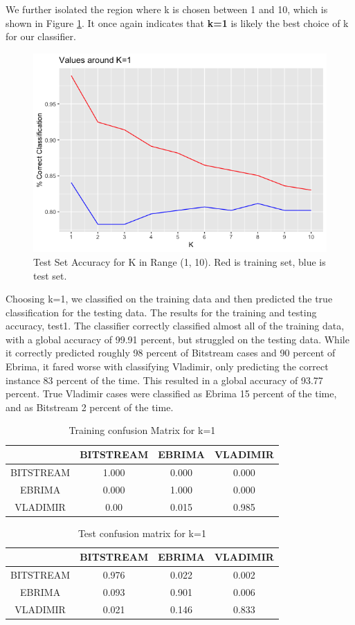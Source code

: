 \documentclass{homework}
\begin{document}
\question
We further isolated the region where k is chosen between 1 and 10, which is shown in Figure \ref{fig:Figure 2}. It once again indicates that \textbf{k=1} is likely the best choice of k for our classifier.

\begin{figure}[h]
    \centering
    \includegraphics[width=13cm]{graphs/Kbest.png}
    \caption{Test Set Accuracy for K in Range (1, 10). Red is training set, blue is test set.}
    \label{fig:Figure 2}
\end{figure}

\question
Choosing k=1, we classified on the training data and then predicted the true classification for the testing data. The results for the training and testing accuracy, test1. The classifier correctly classified almost all of the training data, with a global accuracy of 99.91 percent, but struggled on the testing data. While it correctly predicted roughly 98 percent of Bitstream cases and 90 percent of Ebrima, it fared worse with classifying Vladimir, only predicting the correct instance 83 percent of the time. This resulted in a global accuracy of 93.77 percent. True Vladimir cases were classified as Ebrima 15 percent of the time, and as Bitstream 2 percent of the time.

\begin{table}[h]
    \centering
        \begin{tabular}{c|ccc}
         &BITSTREAM&EBRIMA&VLADIMIR\\\hline
         BITSTREAM&1.000&0.000&0.000\\
         EBRIMA&0.000&1.000&0.000\\
         VLADIMIR&0.00&0.015&0.985
    \end{tabular}
    \caption{Training confusion Matrix for k=1}
    \label{tab:Table 3}
\end{table}
\begin{table}[h]
    \centering
    \begin{tabular}{c|ccc}
         &BITSTREAM&EBRIMA&VLADIMIR\\\hline
         BITSTREAM&0.976&0.022&0.002\\
         EBRIMA&0.093&0.901&0.006\\
         VLADIMIR&0.021&0.146&0.833
    \end{tabular}
    \caption{Test confusion matrix for k=1}
    \label{tab:Table 4}
\end{table}
\end{document}
